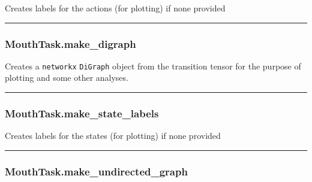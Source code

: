 Creates labels for the actions (for plotting) if none provided

\begin{center}\rule{0.5\linewidth}{\linethickness}\end{center}

\subsubsection{MouthTask.make\_digraph}\label{mouthtask.make_digraph}

\begin{Shaded}
\begin{Highlighting}[]
\NormalTok{)}
\end{Highlighting}
\end{Shaded}

Creates a \texttt{networkx} \texttt{DiGraph} object from the transition
tensor for the purpose of plotting and some other analyses.

\begin{center}\rule{0.5\linewidth}{\linethickness}\end{center}

\subsubsection{MouthTask.make\_state\_labels}\label{mouthtask.make_state_labels}

\begin{Shaded}
\begin{Highlighting}[]
\NormalTok{)}
\end{Highlighting}
\end{Shaded}

Creates labels for the states (for plotting) if none provided

\begin{center}\rule{0.5\linewidth}{\linethickness}\end{center}

\subsubsection{MouthTask.make\_undirected\_graph}\label{mouthtask.make_undirected_graph}

\begin{Shaded}
\begin{Highlighting}[]
\NormalTok{)}
\end{Highlighting}
\end{Shaded}

